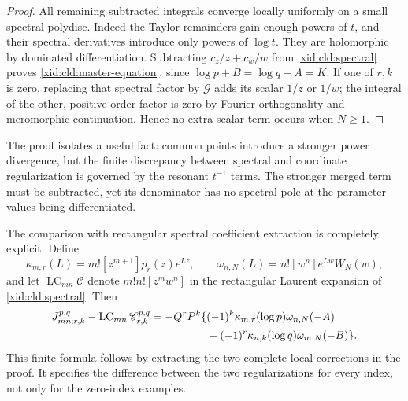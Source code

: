 \begin{proof}
All remaining subtracted integrals converge locally uniformly on a
small spectral polydisc.  Indeed the Taylor remainders gain enough
powers of $t$, and their spectral derivatives introduce only powers
of $\log t$.  They are holomorphic by dominated differentiation.
Subtracting $c_z/z+c_w/w$ from \eqref{xid:cld:spectral} proves
\eqref{xid:cld:master-equation}, since $\log p+B=\log q+A=K$.
If one of $r,k$ is zero, replacing that spectral factor by
$\mathscr G$ adds its scalar $1/z$ or $1/w$; the integral of the other,
positive-order factor is zero by Fourier orthogonality and meromorphic
continuation.  Hence no extra scalar term occurs when $N\ge1$.
\end{proof}

The proof isolates a useful fact: common points introduce a stronger
power divergence, but the finite discrepancy between spectral and
coordinate regularization is governed by the resonant $t^{-1}$ terms.
The stronger merged term must be subtracted, yet its denominator has no
spectral pole at the parameter values being differentiated.

The comparison with rectangular spectral coefficient extraction is
completely explicit.  Define
\[
 \kappa_{m,r}(L)=m![z^{m+1}]p_r(z)e^{Lz},\qquad
 \omega_{n,N}(L)=n![w^n]e^{Lw}W_N(w),
\]
and let $\operatorname{LC}_{mn}\mathscr C$ denote
$m!n![z^mw^n]$ in the rectangular Laurent expansion of
\eqref{xid:cld:spectral}.  Then
\begin{align}
 J_{mn;r,k}^{p,q}-\operatorname{LC}_{mn}\mathscr C_{r,k}^{p,q}
 =-Q^rP^k\{&(-1)^k\kappa_{m,r}(\log p)\omega_{n,N}(-A)\notag\\
           &+(-1)^r\kappa_{n,k}(\log q)\omega_{m,N}(-B)\}.
 \label{xid:cld:spectral-contact-difference}
\end{align}
This finite formula follows by extracting the two complete local
corrections in the proof.  It specifies the difference between the two
regularizations for every index, not only for the zero-index examples.

